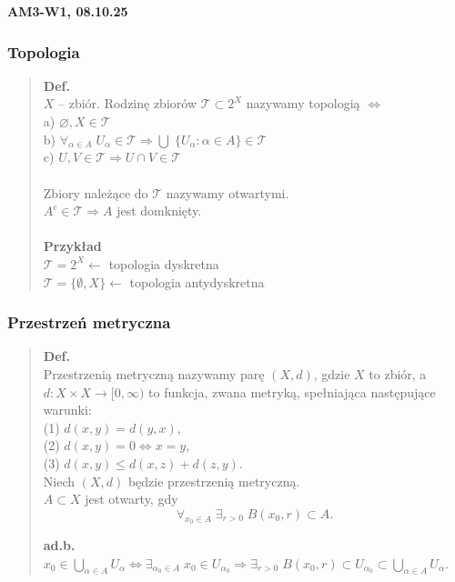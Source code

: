 \documentclass[10pt,a4paper]{article}
\newcommand{\zagadnienie}[3]{%
    \clearpage %
    \noindent\textbf{#1} #2\\
    #3
}
\begin{document}
\zagadnienie{AM3-W1, 08.10.25}{}
{
  \subsubsection*{Topologia}
    \begin{quote}
    \textbf{Def.}\\ \( X \) – zbiór. Rodzinę zbiorów \( \mathcal{T} \subset 2^X \) nazywamy topologią \( \Leftrightarrow \)\\
    a) \( \varnothing, X \in \mathcal{T} \)\\
    b) \( \forall_{\alpha \in A} \;U_\alpha \in \mathcal{T} \Rightarrow \bigcup \; \{U_\alpha: \alpha \in A\} \in \mathcal{T} \)\\
    c) \( U, V \in \mathcal{T} \Rightarrow U \cap V \in \mathcal{T} \)\\
    \\
    Zbiory należące do \( \mathcal{T} \) nazywamy otwartymi.\\
    \( A^c \in \mathcal{T} \Rightarrow A \) jest domknięty.\\\\
    \textbf{Przykład}\\
    $\mathcal{T} = 2^X \leftarrow$ topologia dyskretna \\
    $\mathcal{T} = \{\emptyset, X\} \leftarrow$ topologia antydyskretna
    \end{quote}

    \subsubsection*{Przestrzeń metryczna}
    \begin{quote}
    \textbf{Def.}\\ Przestrzenią metryczną nazywamy parę $(X, d)$, gdzie $X$ to zbiór, a $d: X \times X \to [0, \infty)$ to funkcja, zwana metryką, spełniająca następujące warunki:\\
    (1) $d(x, y) = d(y, x)$,\\
    (2) $d(x, y) = 0 \iff x = y$,\\
    (3) $d(x, y) \leq d(x, z) + d(z, y)$.\\

    Niech \( (X,d) \) będzie przestrzenią metryczną.\\
    \( A \subset X \) jest otwarty, gdy
    \[
    \forall_{x_0 \in A}\; \exists_{r>0}\; B(x_0, r) \subset A.
    \]

    \begin{tcolorbox}[mybox]
    \textbf{ad.b.}\\
    \( x_0 \in \bigcup_{\alpha \in A} U_\alpha \Leftrightarrow \exists_{\alpha_0 \in A}\; x_0 \in U_{\alpha_0} \Rightarrow \exists_{r>0}\; B(x_0,r) \subset U_{\alpha_0} \subset \bigcup_{\alpha \in A} U_\alpha \).\\


\end{tcolorbox}
\end{quote}}
\end{document}
